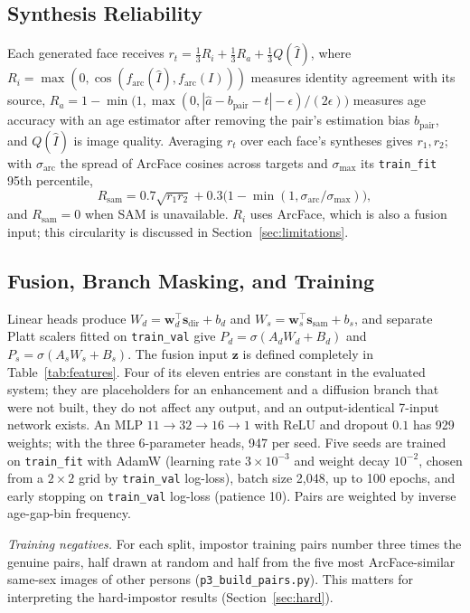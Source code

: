 \documentclass[journal]{IEEEtran}
\newcommand{\vect}[1]{\mathbf{#1}}
\begin{document}
\subsection{Synthesis Reliability}
Each generated face receives $r_t=\frac13 R_i+\frac13 R_a+\frac13 Q(\hat I)$, where $R_i=\max(0,\cos(f_{\text{arc}}(\hat I),f_{\text{arc}}(I)))$ measures identity agreement with its source, $R_a=1-\min\!\big(1,\max(0,|\hat a-b_{\text{pair}}-t|-\epsilon)/(2\epsilon)\big)$ measures age accuracy with an age estimator after removing the pair's estimation bias $b_{\text{pair}}$, and $Q(\hat I)$ is image quality. Averaging $r_t$ over each face's syntheses gives $r_1,r_2$; with $\sigma_{\text{arc}}$ the spread of ArcFace cosines across targets and $\sigma_{\max}$ its \texttt{train\_fit} 95th percentile,
\begin{equation}
\label{eq:rsam}
R_{\text{sam}}=0.7\sqrt{r_1r_2}+0.3\big(1-\min(1,\sigma_{\text{arc}}/\sigma_{\max})\big),
\end{equation}
and $R_{\text{sam}}=0$ when SAM is unavailable. $R_i$ uses ArcFace, which is also a fusion input; this circularity is discussed in Section~\ref{sec:limitations}.

\subsection{Fusion, Branch Masking, and Training}
Linear heads produce $W_d=\vect{w}_d^{\top}\vect{s}_{\text{dir}}+b_d$ and $W_s=\vect{w}_s^{\top}\vect{s}_{\text{sam}}+b_s$, and separate Platt scalers fitted on \texttt{train\_val} give $P_d=\sigma(A_dW_d+B_d)$ and $P_s=\sigma(A_sW_s+B_s)$. The fusion input $\vect{z}$ is defined completely in Table~\ref{tab:features}. Four of its eleven entries are constant in the evaluated system; they are placeholders for an enhancement and a diffusion branch that were not built, they do not affect any output, and an output-identical 7-input network exists. An MLP $11\to32\to16\to1$ with ReLU and dropout $0.1$ has 929 weights; with the three 6-parameter heads, 947 per seed. Five seeds are trained on \texttt{train\_fit} with AdamW (learning rate $3\times10^{-3}$ and weight decay $10^{-2}$, chosen from a $2\times2$ grid by \texttt{train\_val} log-loss), batch size 2,048, up to 100 epochs, and early stopping on \texttt{train\_val} log-loss (patience 10). Pairs are weighted by inverse age-gap-bin frequency.

\emph{Training negatives.} For each split, impostor training pairs number three times the genuine pairs, half drawn at random and half from the five most ArcFace-similar same-sex images of other persons (\texttt{p3\_build\_pairs.py}). This matters for interpreting the hard-impostor results (Section~\ref{sec:hard}).
\end{document}
